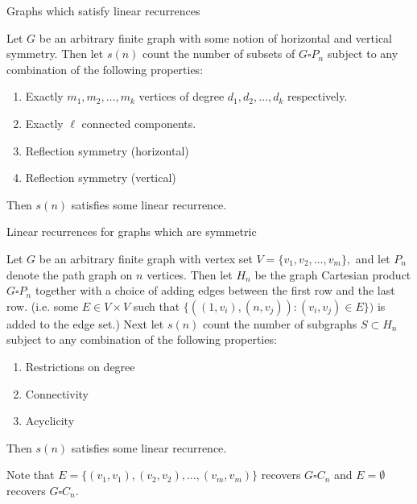 \documentclass{beamer}%
\begin{document}
\begin{frame}{Graphs which satisfy linear recurrences}
  \begin{corollary}
    Let $G$ be an arbitrary finite graph with some notion of horizontal and
    vertical symmetry. Then let $s(n)$ count the number of subsets of
    $G \square P_n$ subject to any combination of the following properties:
    \begin{enumerate}
      \item Exactly $m_1, m_2, \hdots, m_k$ vertices of degree
        $d_1, d_2, \hdots, d_k$ respectively.
      \item Exactly $\ell$ connected components.
      \item Reflection symmetry (horizontal)
      \item Reflection symmetry (vertical)
    \end{enumerate}
    Then $s(n)$ satisfies some linear recurrence.
  \end{corollary}
\end{frame}

\begin{frame}{Linear recurrences for graphs which are symmetric}
  \begin{theorem}
    Let $G$ be an arbitrary finite graph with vertex set
    $V = \{ v_1, v_2, \hdots, v_m \},$
    and let $P_n$ denote the path graph on $n$ vertices.
    Then let $H_n$ be the graph Cartesian product $G \square P_n$ together with
    a choice of adding edges between the first row and the last row.
    (i.e. some $E \in V \times V$ such that
    $\{((1, v_i), (n, v_j)) : (v_i, v_j) \in E\})$ is added to the edge set.)
    Next let $s(n)$ count the number of subgraphs $S \subset H_n$
    subject to any combination of the following properties:
    \begin{enumerate}
      \item Restrictions on degree
      \item Connectivity
      \item Acyclicity
    \end{enumerate}
    Then $s(n)$ satisfies some linear recurrence.
  \end{theorem}
  Note that $E = \{(v_1, v_1), (v_2, v_2), \hdots, (v_m, v_m)\}$ recovers
  $G \square C_n$ and $E = \emptyset$ recovers $G \square C_n$.
\end{frame}
\end{document}
